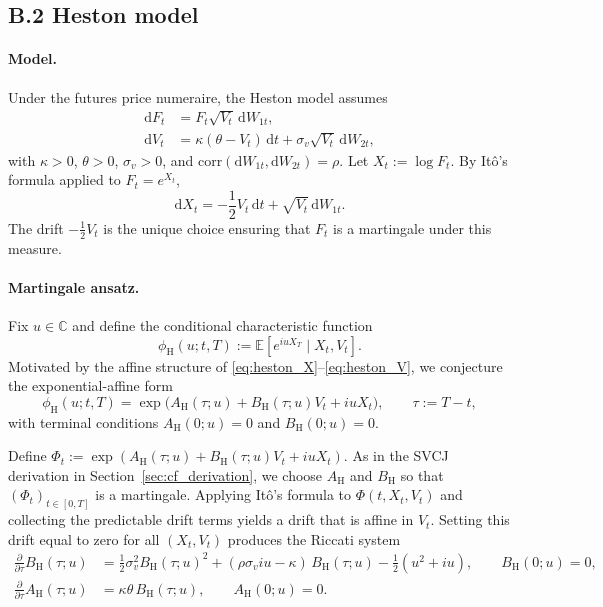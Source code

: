 \documentclass[a4paper,titlepage,12pt]{report}
\theoremstyle{plain}
\begin{document}
\subsection*{B.2 Heston model}
\label{app:heston_cf}

\paragraph{Model.}
Under the futures price numeraire, the Heston model assumes
\begin{align}
\mathrm{d}F_t
&=
F_t\sqrt{V_t}\,\mathrm{d}W_{1t},
\label{eq:heston_F}\\
\mathrm{d}V_t
&=
\kappa(\theta-V_t)\,\mathrm{d}t
+
\sigma_v\sqrt{V_t}\,\mathrm{d}W_{2t},
\label{eq:heston_V}
\end{align}
with $\kappa>0$, $\theta>0$, $\sigma_v>0$, and $\mathrm{corr}(\mathrm{d}W_{1t},\mathrm{d}W_{2t})=\rho$.
Let $X_t:=\log F_t$. By It\^{o}'s formula applied to $F_t=e^{X_t}$,
\begin{equation}
\mathrm{d}X_t
=
-\frac12 V_t\,\mathrm{d}t
+
\sqrt{V_t}\,\mathrm{d}W_{1t}.
\label{eq:heston_X}
\end{equation}
The drift $-\tfrac12V_t$ is the unique choice ensuring that $F_t$ is a martingale under this measure.

\paragraph{Martingale ansatz.}
Fix $u\in\mathbb{C}$ and define the conditional characteristic function
\[
\phi_{\mathrm{H}}(u;t,T)
:=
\mathbb{E}\!\left[e^{iuX_T}\mid X_t,V_t\right].
\]
Motivated by the affine structure of \eqref{eq:heston_X}--\eqref{eq:heston_V}, we conjecture the
exponential-affine form
\begin{equation}
\phi_{\mathrm{H}}(u;t,T)
=
\exp\!\big(A_{\mathrm{H}}(\tau;u)+B_{\mathrm{H}}(\tau;u)V_t+iuX_t\big),
\qquad \tau:=T-t,
\label{eq:heston_affine_ansatz}
\end{equation}
with terminal conditions $A_{\mathrm{H}}(0;u)=0$ and $B_{\mathrm{H}}(0;u)=0$.

Define $\Phi_t:=\exp(A_{\mathrm{H}}(\tau;u)+B_{\mathrm{H}}(\tau;u)V_t+iuX_t)$. As in the SVCJ
derivation in Section~\ref{sec:cf_derivation}, we choose $A_{\mathrm{H}}$ and $B_{\mathrm{H}}$ so that
$(\Phi_t)_{t\in[0,T]}$ is a martingale. Applying It\^{o}'s formula to $\Phi(t,X_t,V_t)$ and collecting
the predictable drift terms yields a drift that is affine in $V_t$. Setting this drift equal to zero
for all $(X_t,V_t)$ produces the Riccati system
\begin{align}
\frac{\partial}{\partial \tau}B_{\mathrm{H}}(\tau;u)
&=
\frac12\sigma_v^2 B_{\mathrm{H}}(\tau;u)^2
+
(\rho\sigma_v iu-\kappa)\,B_{\mathrm{H}}(\tau;u)
-\frac12(u^2+iu),
\qquad B_{\mathrm{H}}(0;u)=0,
\label{eq:heston_B_riccati}
\\[4pt]
\frac{\partial}{\partial \tau}A_{\mathrm{H}}(\tau;u)
&=
\kappa\theta\,B_{\mathrm{H}}(\tau;u),
\qquad A_{\mathrm{H}}(0;u)=0.
\label{eq:heston_A_ode}
\end{align}
\end{document}
